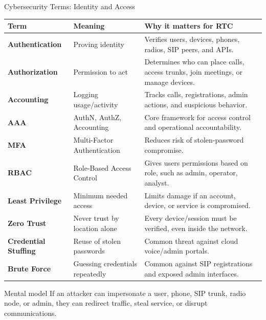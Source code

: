 \documentclass[aspectratio=169]{beamer}
\begin{document}
\begin{frame}{Cybersecurity Terms: Identity and Access}
\tiny
\begin{tabular}{p{2.2cm} p{3.5cm} p{6.5cm}}
\toprule
\textbf{Term} & \textbf{Meaning} & \textbf{Why it matters for RTC} \\
\midrule
\textbf{Authentication} & Proving identity & Verifies users, devices, phones, radios, SIP peers, and APIs. \\
\textbf{Authorization} & Permission to act & Determines who can place calls, access trunks, join meetings, or manage devices. \\
\textbf{Accounting} & Logging usage/activity & Tracks calls, registrations, admin actions, and suspicious behavior. \\
\textbf{AAA} & AuthN, AuthZ, Accounting & Core framework for access control and operational accountability. \\
\textbf{MFA} & Multi-Factor Authentication & Reduces risk of stolen-password compromise. \\
\textbf{RBAC} & Role-Based Access Control & Gives users permissions based on role, such as admin, operator, analyst. \\
\textbf{Least Privilege} & Minimum needed access & Limits damage if an account, device, or service is compromised. \\
\textbf{Zero Trust} & Never trust by location alone & Every device/session must be verified, even inside the network. \\
\textbf{Credential Stuffing} & Reuse of stolen passwords & Common threat against cloud voice/admin portals. \\
\textbf{Brute Force} & Guessing credentials repeatedly & Common against SIP registrations and exposed admin interfaces. \\
\bottomrule
\end{tabular}

\vspace{0.15cm}
\begin{block}{Mental model}
If an attacker can impersonate a user, phone, SIP trunk, radio node, or admin, they can redirect traffic, steal service, or disrupt communications.
\end{block}
\end{frame}
\end{document}
